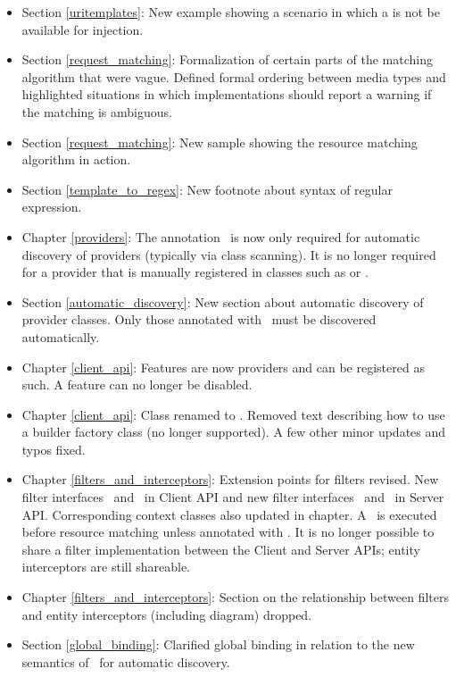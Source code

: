 \begin{itemize}
\item Section \ref{uritemplates}: New example showing a scenario in which a  is not be available for injection. 
\item Section \ref{request_matching}: Formalization of certain parts of the matching algorithm that were vague. Defined formal ordering between media types and highlighted situations in which implementations should report a warning if the matching is ambiguous. 
\item Section \ref{request_matching}: New sample showing the resource matching algorithm in action.
\item Section \ref{template_to_regex}: New footnote about syntax of regular expression.
\item Chapter \ref{providers}: The annotation \Provider\ is now only required for automatic discovery of providers (typically via class scanning). It is no longer required for a provider that is manually registered in classes such as  or .
\item Section \ref{automatic_discovery}: New section about automatic discovery of provider classes. Only those annotated with \Provider\ must be discovered automatically.
\item Chapter \ref{client_api}: Features are now providers and can be registered as such. A feature can no longer be disabled.
\item Chapter \ref{client_api}: Class  renamed to \WebTarget. Removed text describing how to use a builder factory class (no longer supported). A few other minor updates and typos fixed.
\item Chapter \ref{filters_and_interceptors}: Extension points for filters revised. New filter interfaces \ClientRequestFilter\ and \ClientResponseFilter\ in Client API and new filter interfaces \ContainerRequestFilter\ and \ContainerResponseFilter\ in Server API. Corresponding context classes also updated in chapter. A \ContainerRequestFilter\ is executed before resource matching unless annotated with \PostMatching. It is no longer possible to share a filter implementation between the Client and Server APIs; entity interceptors are still shareable.
\item Chapter \ref{filters_and_interceptors}: Section on the relationship between filters and entity interceptors (including diagram) dropped.
\item Section \ref{global_binding}: Clarified global binding in relation to the new semantics of \Provider\ for automatic discovery.

\end{itemize}
